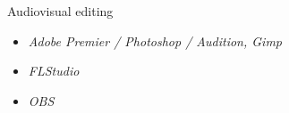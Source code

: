 \vspace{2mm}
\hspace{-2mm}
{\fontsize{12}{10}\selectfont \hspace{3.8mm} Audiovisual editing}\newline
\vspace{-6mm}
\begin{itemize}[noitemsep]
    \item[\tiny\ding{110}] \textit{Adobe Premier / Photoshop / Audition, Gimp}
    \item[\tiny\ding{110}] \textit{FLStudio}
    \item[\tiny\ding{110}] \textit{OBS}
\end{itemize}
\vspace{2mm}
